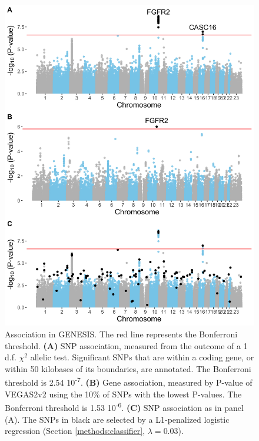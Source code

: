 \documentclass[twocolumn, 11pt, draft]{article}
\begin{document}
\begin{figure}[htbp]
  \centering
  \includegraphics[width=.9\linewidth]{./figures/sfigure_2.png}
  \caption{\label{sfig:snp_gene_manhattan} Association in GENESIS. The red line represents the Bonferroni threshold. \textbf{(A)} SNP association, measured from the outcome of a 1 d.f. $\chi^2$ allelic test. Significant SNPs that are within a coding gene, or within 50 kilobases of its boundaries, are annotated. The Bonferroni threshold is 2.54 \texttimes{} 10\textsuperscript{-7}. \textbf{(B)} Gene association, measured by P-value of VEGAS2v2 \cite{mishra_vegas2:_2015} using the 10\% of SNPs with the lowest P-values. The Bonferroni threshold is 1.53 \texttimes{} 10\textsuperscript{-6}. \textbf{(C)} SNP association as in panel (A). The SNPs in black are selected by a L1-penalized logistic regression (Section \ref{methods:classifier}, $\lambda = 0.03$).}
\end{figure}
\end{document}
